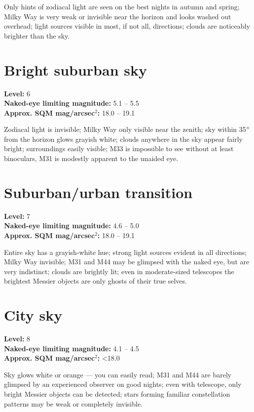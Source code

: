 Only hints of zodiacal light are seen on the best nights in autumn and
spring; Milky Way is very weak or invisible near the horizon and looks
washed out overhead; light sources visible in most, if not all,
directions; clouds are noticeably brighter than the sky.

\section{Bright suburban sky}
\textbf{Level:} 6 \\
\textbf{Naked-eye limiting magnitude:} 5.1 -- 5.5 \\
\textbf{Approx. SQM mag/arcsec$^2$:} 18.0 -- 19.1

Zodiacal light is invisible; Milky Way only visible near the zenith;
sky within 35$\degree$ from the horizon glows grayish white; clouds
anywhere in the sky appear fairly bright; surroundings easily visible;
M33 is impossible to see without at least binoculars, M31 is modestly
apparent to the unaided eye.

\section{Suburban/urban transition}
\textbf{Level:} 7 \\
\textbf{Naked-eye limiting magnitude:} 4.6 -- 5.0 \\
\textbf{Approx. SQM mag/arcsec$^2$:} 18.0 -- 19.1

Entire sky has a grayish-white hue; strong light sources evident in
all directions; Milky Way invisible; M31 and M44 may be glimpsed with
the naked eye, but are very indistinct; clouds are brightly lit; even
in moderate-sized telescopes the brightest Messier objects are only
ghosts of their true selves.

\section{City sky}
\textbf{Level:} 8 \\
\textbf{Naked-eye limiting magnitude:} 4.1 -- 4.5 \\
\textbf{Approx. SQM mag/arcsec$^2$:} <18.0

Sky glows white or orange --- you can easily read; M31 and M44 are
barely glimpsed by an experienced observer on good nights; even with
telescope, only bright Messier objects can be detected; stars forming
familiar constellation patterns may be weak or completely invisible.

